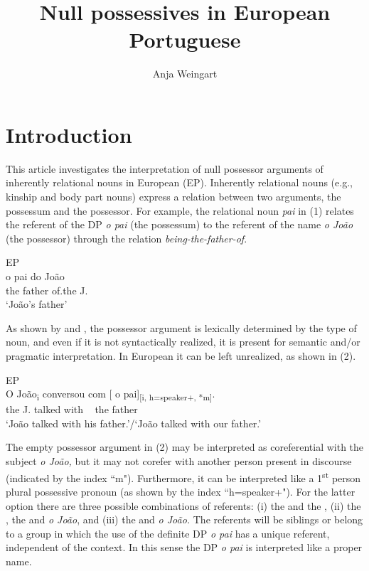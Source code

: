 \documentclass[output=paper]{langsci/langscibook}
\author{Anja Weingart\affiliation{Georg-August-Universität Göttingen}}
\title{Null possessives in European Portuguese}
\begin{document}

\section{Introduction}%

This article investigates the interpretation of null possessor arguments of inherently relational nouns in European  (EP). Inherently relational nouns (e.g., kinship and body part nouns) express a relation between two arguments, the possessum and the possessor. For example, the relational noun \textit{pai} in (1) relates the referent of the DP \textit{o pai} (the possessum) to the referent of the name \textit{o João} (the possessor) through the relation \textit{being-the-father-of}.

\ea%
         EP\label{ex:wein:1}\\
    \gll o   pai   do   João\\
         the   father of.the   J.\\
    \glt ‘João’s father’
    \z


As shown by \citet{Barker2011} and \citet{Löbner2011}, the possessor argument is lexically determined by the type of noun, and even if it is not syntactically realized, it is present for semantic and\slash or pragmatic interpretation. In European  it can be left unrealized, as shown in (2).

\ea%
         EP\label{ex:wein:2}\\
    \gll O  João\textsubscript{i}   conversou     com [ o   pai]\textsubscript{[i, h=speaker+, *m]}.\\
         the J.     talked   with ~ the father\\
    \glt ‘João talked with his father.’\slash ‘João talked with our father.’
\z

The empty possessor argument in (2) may be interpreted as coreferential with the subject \textit{o João,} but it may not corefer with another person present in discourse (indicated by the index “m"). Furthermore, it can be interpreted like a 1\textsuperscript{st} person plural possessive pronoun (as shown by the index “h=speaker+"). For the latter option there are three possible combinations of referents: (i) the  and the , (ii) the , the  and \textit{o João}, and (iii) the  and \textit{o João.} The referents will be siblings or belong to a group in which the use of the definite DP \textit{o pai} has a unique referent, independent of the context. In this sense the DP \textit{o pai} is interpreted like a proper name.
\end{document}
